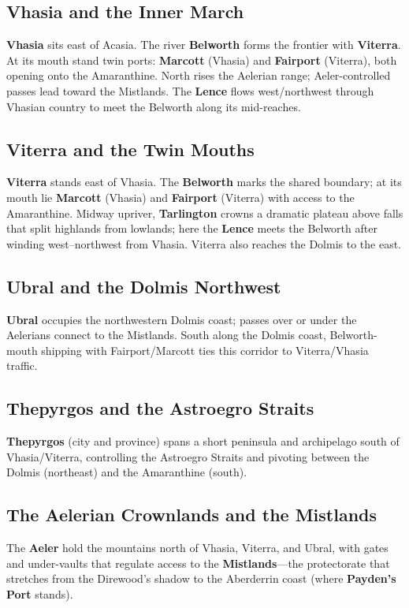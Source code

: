 \documentclass[11pt]{article}
\begin{document}
\subsection*{Vhasia and the Inner March}
\textbf{Vhasia} sits east of Acasia. The river \textbf{Belworth} forms the frontier with \textbf{Viterra}. At its mouth stand twin ports: \textbf{Marcott} (Vhasia) and \textbf{Fairport} (Viterra), both opening onto the Amaranthine. North rises the Aelerian range; Aeler-controlled passes lead toward the Mistlands. The \textbf{Lence} flows west/northwest through Vhasian country to meet the Belworth along its mid-reaches.

\subsection*{Viterra and the Twin Mouths}
\textbf{Viterra} stands east of Vhasia. The \textbf{Belworth} marks the shared boundary; at its mouth lie \textbf{Marcott} (Vhasia) and \textbf{Fairport} (Viterra) with access to the Amaranthine. Midway upriver, \textbf{Tarlington} crowns a dramatic plateau above falls that split highlands from lowlands; here the \textbf{Lence} meets the Belworth after winding west--northwest from Vhasia. Viterra also reaches the Dolmis to the east.

\subsection*{Ubral and the Dolmis Northwest}
\textbf{Ubral} occupies the northwestern Dolmis coast; passes over or under the Aelerians connect to the Mistlands. South along the Dolmis coast, Belworth-mouth shipping with Fairport/Marcott ties this corridor to Viterra/Vhasia traffic.

\subsection*{Thepyrgos and the Astroegro Straits}
\textbf{Thepyrgos} (city and province) spans a short peninsula and archipelago south of Vhasia/Viterra, controlling the Astroegro Straits and pivoting between the Dolmis (northeast) and the Amaranthine (south).

\subsection*{The Aelerian Crownlands and the Mistlands}
The \textbf{Aeler} hold the mountains north of Vhasia, Viterra, and Ubral, with gates and under-vaults that regulate access to the \textbf{Mistlands}---the protectorate that stretches from the Direwood's shadow to the Aberderrin coast (where \textbf{Payden's Port} stands).
\end{document}
